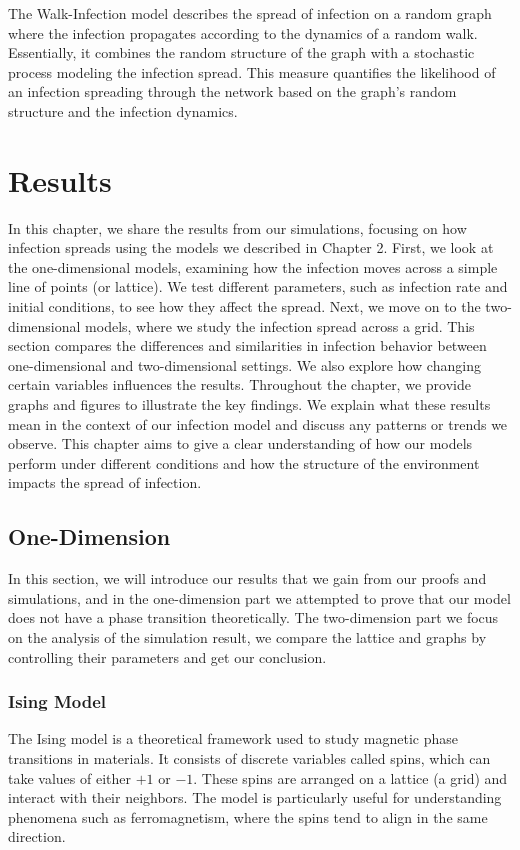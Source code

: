 \documentclass[11pt]{book}
\begin{document}
The Walk-Infection model describes the spread of infection on a random graph where the infection propagates according to the dynamics of a random walk. Essentially, it combines the random structure of the graph with a stochastic process modeling the infection spread. This measure quantifies the likelihood of an infection spreading through the network based on the graph’s random structure and the infection dynamics.


\chapter{Results}

In this chapter, we share the results from our simulations, focusing on how infection spreads using the models we described in Chapter 2. First, we look at the one-dimensional models, examining how the infection moves across a simple line of points (or lattice). We test different parameters, such as infection rate and initial conditions, to see how they affect the spread. Next, we move on to the two-dimensional models, where we study the infection spread across a grid. This section compares the differences and similarities in infection behavior between one-dimensional and two-dimensional settings. We also explore how changing certain variables influences the results. Throughout the chapter, we provide graphs and figures to illustrate the key findings. We explain what these results mean in the context of our infection model and discuss any patterns or trends we observe. This chapter aims to give a clear understanding of how our models perform under different conditions and how the structure of the environment impacts the spread of infection.


\section{One-Dimension}

In this section, we will introduce our results that we gain from our proofs and simulations, and in the one-dimension part we attempted to prove that our model does not have a phase transition theoretically. The two-dimension part we focus on the analysis of the simulation result, we compare the lattice and graphs by controlling their parameters and get our conclusion.

\subsection{Ising Model}\label{3.1.1}
The Ising model is a theoretical framework used to study magnetic phase transitions in materials. It consists of discrete variables called spins, which can take values of either $+1$ or $-1$. These spins are arranged on a lattice (a grid) and interact with their neighbors. The model is particularly useful for understanding phenomena such as ferromagnetism, where the spins tend to align in the same direction.
\end{document}
